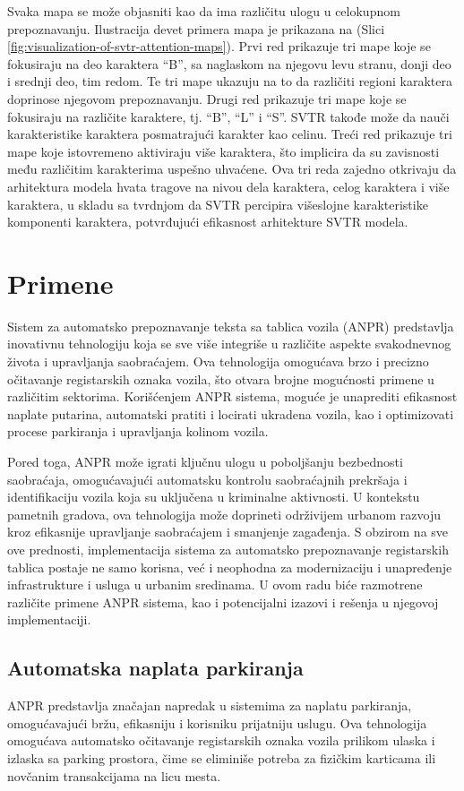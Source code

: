 \documentclass[a4paper,12pt]{article}
\begin{document}
	Svaka mapa se može objasniti kao da ima različitu ulogu u celokupnom prepoznavanju. Ilustracija devet primera mapa je prikazana na (Slici \ref{fig:visualization-of-svtr-attention-maps}). Prvi red prikazuje tri mape koje se fokusiraju na deo karaktera \enquote{B}, sa naglaskom na njegovu levu stranu, donji deo i srednji deo, tim redom. Te tri mape ukazuju na to da različiti regioni karaktera doprinose njegovom prepoznavanju. Drugi red prikazuje tri mape koje se fokusiraju na različite karaktere, tj. \enquote{B}, \enquote{L} i \enquote{S}. SVTR takođe može da nauči karakteristike karaktera posmatrajući karakter kao celinu. Treći red prikazuje tri mape koje istovremeno aktiviraju više karaktera, što implicira da su zavisnosti među različitim karakterima uspešno uhvaćene. Ova tri reda zajedno otkrivaju da arhitektura modela hvata tragove na nivou dela karaktera, celog karaktera i više karaktera, u skladu sa tvrdnjom da SVTR percipira višeslojne karakteristike komponenti karaktera, potvrđujući efikasnost arhitekture SVTR modela.
	\newpage
	
	\section{Primene}
	Sistem za automatsko prepoznavanje teksta sa tablica vozila (ANPR) predstavlja inovativnu tehnologiju koja se sve više integriše u različite aspekte svakodnevnog života i upravljanja saobraćajem. Ova tehnologija omogućava brzo i precizno očitavanje registarskih oznaka vozila, što otvara brojne mogućnosti primene u različitim sektorima. Korišćenjem ANPR sistema, moguće je unaprediti efikasnost naplate putarina, automatski pratiti i locirati ukradena vozila, kao i optimizovati procese parkiranja i upravljanja kolinom vozila. 
	
	Pored toga, ANPR može igrati ključnu ulogu u poboljšanju bezbednosti saobraćaja, omogućavajući automatsku kontrolu saobraćajnih prekršaja i identifikaciju vozila koja su uključena u kriminalne aktivnosti. U kontekstu pametnih gradova, ova tehnologija može doprineti održivijem urbanom razvoju kroz efikasnije upravljanje saobraćajem i smanjenje zagađenja. S obzirom na sve ove prednosti, implementacija sistema za automatsko prepoznavanje registarskih tablica postaje ne samo korisna, već i neophodna za modernizaciju i unapređenje infrastrukture i usluga u urbanim sredinama. U ovom radu biće razmotrene različite primene ANPR sistema, kao i potencijalni izazovi i rešenja u njegovoj implementaciji.
	
	\subsection{Automatska naplata parkiranja}
	ANPR predstavlja značajan napredak u sistemima za naplatu parkiranja, omogućavajući bržu, efikasniju i korisniku prijatniju uslugu. Ova tehnologija omogućava automatsko očitavanje registarskih oznaka vozila prilikom ulaska i izlaska sa parking prostora, čime se eliminiše potreba za fizičkim karticama ili novčanim transakcijama na licu mesta. 
	
\end{document}

